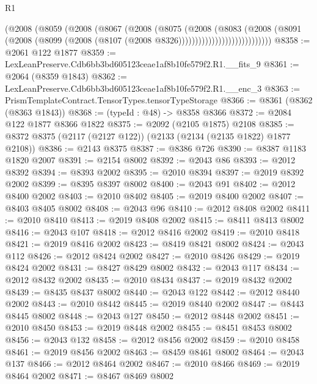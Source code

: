 \begin{lexlean}{R1}
\begin{coremodule}
                              (@2008
                                (@8059
                                  (@2008
                                    (@8067
                                      (@2008
                                        (@8075
                                          (@2008
                                            (@8083
                                              (@2008
                                                (@8091
                                                  (@2008
                                                    (@8099
                                                      (@2008
                                                        (@8107
                                                          (@2008 @8326))))))))))))))))))))))))))))
@8358 := @2061 @122 @1877
@8359 := LexLeanPreserve.Cdb6bb3bd605123ceae1af8b10fe579f2.R1.__fits_9
@8361 := @2064 (@8359 @1843)
@8362 := LexLeanPreserve.Cdb6bb3bd605123ceae1af8b10fe579f2.R1.__enc_3
@8363 := PrismTemplateContract.TensorTypes.tensorTypeStorage
@8366 := @8361 (@8362 (@8363 @1843))
@8368 := (typeId : @48) -> @8358 @8366
@8372 := @2084 @122 @1877 @8366 @1822
@8375 := @2092 (@2105 @1875) @2108
@8385 := @8372 @8375 (@2117 (@2127 @122)) (@2133 (@2134 (@2135 @1822) @1877 @2108))
@8386 := @2143 @8375
@8387 := @8386 @726
@8390 := @8387 @1183 @1820 @2007
@8391 := @2154 @8002
@8392 := @2043 @86
@8393 := @2012 @8392
@8394 := @8393 @2002
@8395 := @2010 @8394
@8397 := @2019 @8392 @2002
@8399 := @8395 @8397 @8002
@8400 := @2043 @91
@8402 := @2012 @8400 @2002
@8403 := @2010 @8402
@8405 := @2019 @8400 @2002
@8407 := @8403 @8405 @8002
@8408 := @2043 @96
@8410 := @2012 @8408 @2002
@8411 := @2010 @8410
@8413 := @2019 @8408 @2002
@8415 := @8411 @8413 @8002
@8416 := @2043 @107
@8418 := @2012 @8416 @2002
@8419 := @2010 @8418
@8421 := @2019 @8416 @2002
@8423 := @8419 @8421 @8002
@8424 := @2043 @112
@8426 := @2012 @8424 @2002
@8427 := @2010 @8426
@8429 := @2019 @8424 @2002
@8431 := @8427 @8429 @8002
@8432 := @2043 @117
@8434 := @2012 @8432 @2002
@8435 := @2010 @8434
@8437 := @2019 @8432 @2002
@8439 := @8435 @8437 @8002
@8440 := @2043 @122
@8442 := @2012 @8440 @2002
@8443 := @2010 @8442
@8445 := @2019 @8440 @2002
@8447 := @8443 @8445 @8002
@8448 := @2043 @127
@8450 := @2012 @8448 @2002
@8451 := @2010 @8450
@8453 := @2019 @8448 @2002
@8455 := @8451 @8453 @8002
@8456 := @2043 @132
@8458 := @2012 @8456 @2002
@8459 := @2010 @8458
@8461 := @2019 @8456 @2002
@8463 := @8459 @8461 @8002
@8464 := @2043 @137
@8466 := @2012 @8464 @2002
@8467 := @2010 @8466
@8469 := @2019 @8464 @2002
@8471 := @8467 @8469 @8002

\end{coremodule}
\end{lexlean}
